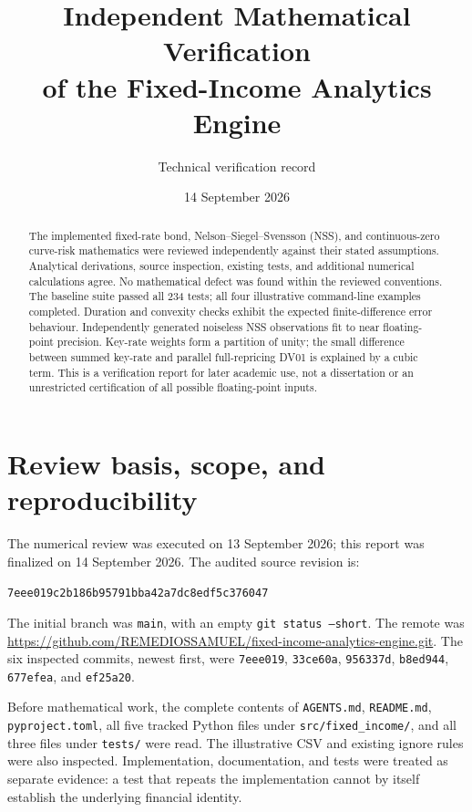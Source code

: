 \documentclass[12pt,a4paper]{article}
\title{Independent Mathematical Verification\\
of the Fixed-Income Analytics Engine}
\author{Technical verification record}
\date{14 September 2026}
\begin{document}
\maketitle
\begin{abstract}
The implemented fixed-rate bond, Nelson--Siegel--Svensson (NSS), and
continuous-zero curve-risk mathematics were reviewed independently against
their stated assumptions. Analytical derivations, source inspection, existing
tests, and additional numerical calculations agree. No mathematical defect
was found within the reviewed conventions. The baseline suite passed all
234 tests; all four illustrative command-line examples completed.
Duration and convexity checks exhibit the expected finite-difference error
behaviour. Independently generated noiseless NSS observations fit to near
floating-point precision. Key-rate weights form a partition of unity;
the small difference between summed key-rate and parallel full-repricing
DV01 is explained by a cubic term.
This is a verification report for later academic use, not a dissertation
or an unrestricted certification of all possible floating-point inputs.
\end{abstract}

\section{Review basis, scope, and reproducibility}
The numerical review was executed on 13 September 2026; this report was
finalized on 14 September 2026. The audited source revision is:
\begin{center}\small
\texttt{7eee019c2b186b95791bba42a7dc8edf5c376047}
\end{center}
The initial branch was \texttt{main}, with an empty
\texttt{git status --short}. The remote was
\url{https://github.com/REMEDIOSSAMUEL/fixed-income-analytics-engine.git}.
The six inspected commits, newest first, were \texttt{7eee019},
\texttt{33ce60a}, \texttt{956337d}, \texttt{b8ed944},
\texttt{677efea}, and \texttt{ef25a20}.

Before mathematical work, the complete contents of \texttt{AGENTS.md},
\texttt{README.md}, \texttt{pyproject.toml}, all five tracked Python files
under \texttt{src/fixed\_income/}, and all three files under \texttt{tests/}
were read. The illustrative CSV and existing ignore rules were also inspected.
Implementation, documentation, and tests were treated as separate evidence:
a test that repeats the implementation cannot by itself establish the
underlying financial identity.
\end{document}
